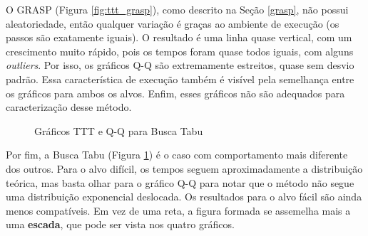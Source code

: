 \documentclass{MO824}
\begin{document}
O GRASP (Figura \ref{fig:ttt_grasp}), como descrito na Seção \ref{grasp}, não possui aleatoriedade, então qualquer variação é graças ao ambiente de execução (os passos são exatamente iguais). O resultado é uma linha quase vertical, com um crescimento muito rápido, pois os tempos foram quase todos iguais, com alguns \textit{outliers}. Por isso, os gráficos Q-Q são extremamente estreitos, quase sem desvio padrão. Essa característica de execução também é visível pela semelhança entre os gráficos para ambos os alvos. Enfim, esses gráficos não são adequados para caracterização desse método.

\begin{figure}
    \centering
    \caption{Gráficos TTT e Q-Q para Busca Tabu}
    \label{fig:ttt_tabu}
\end{figure}

Por fim, a Busca Tabu (Figura \ref{fig:ttt_tabu}) é o caso com comportamento mais diferente dos outros. Para o alvo difícil, os tempos seguem aproximadamente a distribuição teórica, mas basta olhar para o gráfico Q-Q para notar que o método não segue uma distribuição exponencial deslocada. Os resultados para o alvo fácil são ainda menos compatíveis. Em vez de uma reta, a figura formada se assemelha mais a uma \textbf{escada}, que pode ser vista nos quatro gráficos.
\end{document}
